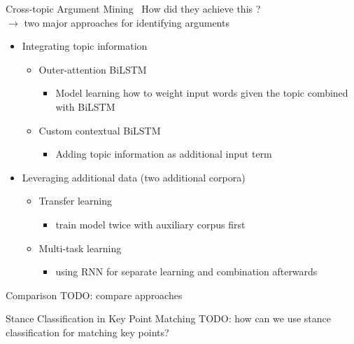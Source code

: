 \documentclass[english,handout]{mlutalk}
\begin{document}
\begin{frame}{Cross-topic Argument Mining~\cite{StabMSRG2018}}
  How did they achieve this ?\\ %
  $\rightarrow$ two major approaches for identifying arguments
  \begin{itemize}
    \item Integrating topic information
    \begin{itemize}
      \item Outer-attention BiLSTM 
      \begin{itemize}
        \item Model learning how to weight input words given the topic combined with BiLSTM
      \end{itemize}
      \item Custom contextual BiLSTM
      \begin{itemize}
        \item Adding topic information as additional input term 
      \end{itemize}
    \end{itemize}
    \item Leveraging additional data (two additional corpora)
    \begin{itemize}
      \item Transfer learning
      \begin{itemize}
        \item train model twice with auxiliary corpus first 
      \end{itemize}
      \item Multi-task learning
      \begin{itemize}
        \item using RNN for separate learning and combination afterwards
      \end{itemize}
    \end{itemize}
  \end{itemize}
\end{frame}

\begin{frame}{Comparison} %
  TODO: compare approaches
\end{frame}

\begin{frame}{Stance Classification in Key Point Matching} %
  TODO: how can we use stance classification for matching key points?
  \thankyou
\end{frame}



\appendix
\section{\appendixname}

\bibliographyframe
\end{document}
